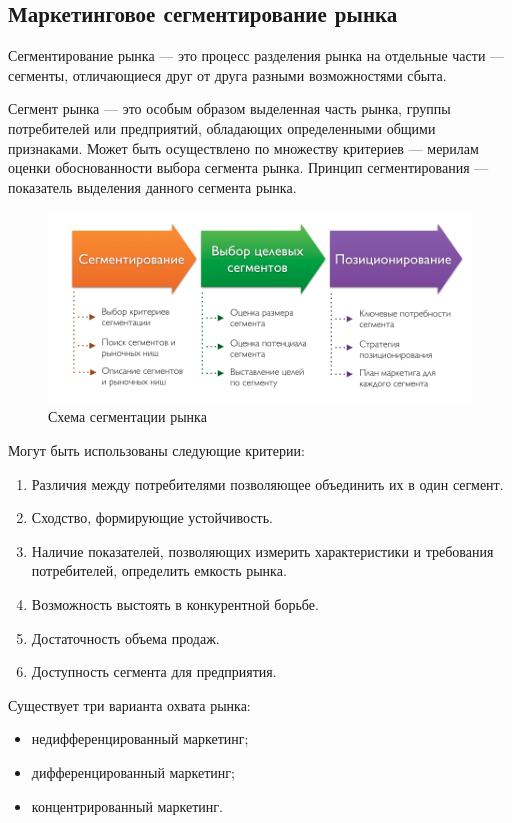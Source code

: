 \documentclass[a4paper,12pt,oneside,final]{extarticle}
\makeatletter
\numberwithin{equation}{section}
\def\maxwidth#1{\ifdim\Gin@nat@width>#1 #1\else\Gin@nat@width\fi}
\makeatother
\begin{document}
\begin{enumerate}
\subsection{Маркетинговое сегментирование рынка}
Сегментирование рынка --- это процесс разделения рынка на отдельные части --- сегменты, отличающиеся друг от друга разными возможностями сбыта.

Сегмент рынка --- это особым образом выделенная часть рынка, группы потребителей или предприятий, обладающих определенными общими признаками. 
Может быть осуществлено по множеству критериев --- мерилам оценки обоснованности выбора сегмента рынка. 
Принцип сегментирования --- показатель выделения данного сегмента рынка. 

\begin{figure}[h]
	\centering
	\includegraphics[width=\maxwidth{\textwidth}]{management-figures/marketing_segmentation_process}
	\caption{Схема сегментации рынка}
\end{figure}

Могут быть использованы следующие критерии:
\begin{enumerate}
	\item Различия между потребителями позволяющее объединить их в один сегмент.
	\item Сходство, формирующие устойчивость.
	\item Наличие показателей, позволяющих измерить характеристики и требования потребителей, определить емкость рынка.
	\item Возможность выстоять в конкурентной борьбе.
	\item Достаточность объема продаж.
	\item Доступность сегмента для предприятия.
\end{enumerate}

Существует три варианта охвата рынка:
\begin{itemize}
	\item недифференцированный маркетинг;
	\item дифференцированный маркетинг;
	\item концентрированный маркетинг.
\end{itemize}


\end{enumerate}
\end{document}
